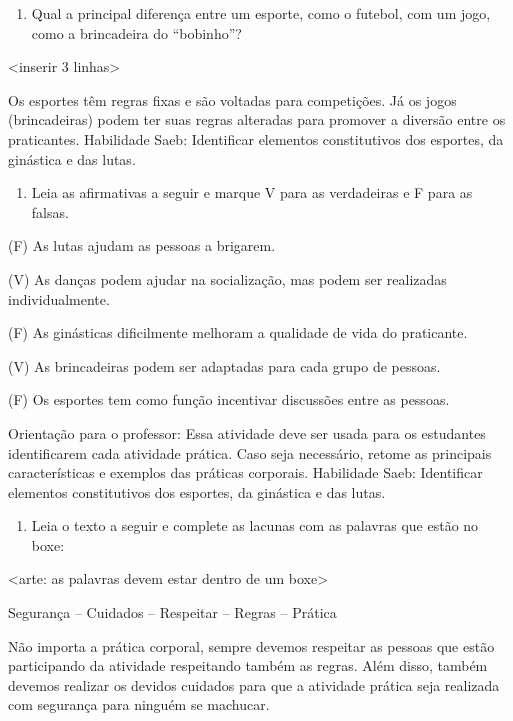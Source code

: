 \begin{enumerate}
\def\labelenumi{\arabic{enumi}.}
\item
  Qual a principal diferença entre um esporte, como o futebol, com um
  jogo, como a brincadeira do ``bobinho''?
\end{enumerate}

\textless{}inserir 3 linhas\textgreater{}

Os esportes têm regras fixas e são voltadas para competições. Já os
jogos (brincadeiras) podem ter suas regras alteradas para promover a
diversão entre os praticantes. Habilidade Saeb: Identificar elementos
constitutivos dos esportes, da ginástica e das lutas.

\begin{enumerate}
\def\labelenumi{\arabic{enumi}.}
\item
  Leia as afirmativas a seguir e marque V para as verdadeiras e F para
  as falsas.
\end{enumerate}

(F) As lutas ajudam as pessoas a brigarem.

(V) As danças podem ajudar na socialização, mas podem ser realizadas
individualmente.

(F) As ginásticas dificilmente melhoram a qualidade de vida do
praticante.

(V) As brincadeiras podem ser adaptadas para cada grupo de pessoas.

(F) Os esportes tem como função incentivar discussões entre as pessoas.

Orientação para o professor: Essa atividade deve ser usada para os
estudantes identificarem cada atividade prática. Caso seja necessário,
retome as principais características e exemplos das práticas corporais.
Habilidade Saeb: Identificar elementos constitutivos dos esportes, da
ginástica e das lutas.

\begin{enumerate}
\def\labelenumi{\arabic{enumi}.}
\item
  Leia o texto a seguir e complete as lacunas com as palavras que estão
  no boxe:
\end{enumerate}

\textless{}arte: as palavras devem estar dentro de um boxe\textgreater{}

Segurança -- Cuidados -- Respeitar -- Regras -- Prática

Não importa a prática corporal, sempre devemos respeitar as pessoas que
estão participando da atividade respeitando também as regras. Além
disso, também devemos realizar os devidos cuidados para que a atividade
prática seja realizada com segurança para ninguém se machucar.

